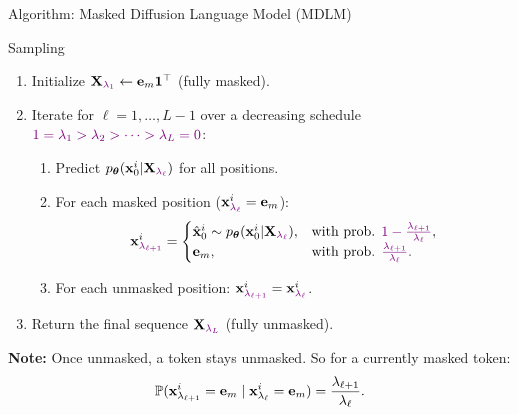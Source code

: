 \documentclass{beamer}
\begin{document}
\begin{frame}{Algorithm: Masked Diffusion Language Model (MDLM)}
	\begin{block}{Sampling}
		\begin{enumerate}
			\item Initialize $\mathbf{X}_{{\color{violet}\lambda_1}} \leftarrow \mathbf{e}_m \mathbf{1}^\top$ (fully masked).
			\item Iterate for $\ell = 1, \ldots, L-1$ over a decreasing schedule ${\color{violet}1 = \lambda_1 > \lambda_2 > \cdots > \lambda_L = 0}$:
			\begin{enumerate}
				\item Predict $p_{\boldsymbol{\theta}}(\mathbf{x}_0^i | \mathbf{X}_{{\color{violet}\lambda_\ell}})$ for all positions.
				\item For each masked position ($\mathbf{x}_{{\color{violet}\lambda_\ell}}^i = \mathbf{e}_m$):
				\vspace{-0.3cm}
				\[
					\mathbf{x}_{{\color{violet}\lambda_{\ell+1}}}^i =
					\begin{cases}
						\hat{\mathbf{x}}_0^i \sim p_{\boldsymbol{\theta}}(\mathbf{x}_0^i | \mathbf{X}_{{\color{violet}\lambda_\ell}}), & \text{with prob. } {\color{violet}1 - \tfrac{\lambda_{\ell+1}}{\lambda_\ell}},\\
						\mathbf{e}_m, & \text{with prob. } {\color{violet}\tfrac{\lambda_{\ell+1}}{\lambda_\ell}}.
					\end{cases}
				\]
				\vspace{-0.5cm}
				\item For each unmasked position: $\mathbf{x}_{{\color{violet}\lambda_{\ell+1}}}^i = \mathbf{x}_{{\color{violet}\lambda_\ell}}^i$.
			\end{enumerate}
			\item Return the final sequence $\mathbf{X}_{{\color{violet}\lambda_L}}$ (fully unmasked).
		\end{enumerate}
	\end{block}
	\textbf{Note:} Once unmasked, a token stays unmasked. So for a currently masked token:
	\[
		\mathbb{P}(\mathbf{x}_{\lambda_{\ell+1}} ^i = \mathbf{e}_m \mid \mathbf{x}_{\lambda_\ell}^i = \mathbf{e}_m)
		= \frac{\lambda_{\ell+1}}{\lambda_\ell}.
	\]
\end{frame}
\end{document}

